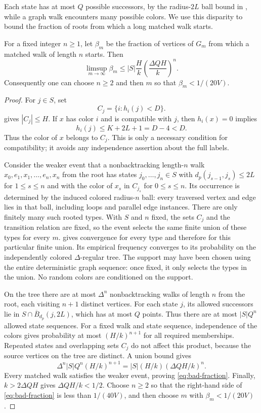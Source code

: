 Each state has at most $Q$ possible successors, by the radius-$2L$
ball bound in , while a graph walk encounters
many possible colors. We use this disparity to bound the
fraction of roots from which a long matched walk starts.

\begin{lemma}\label{lem:rare-walks}
For a fixed integer $n\ge1$, let $\beta_m$ be the fraction of vertices
of $G_m$ from which a matched walk of length $n$ starts. Then
\begin{equation}\label{eq:bad-fraction}
 \limsup_{m\to\infty}\beta_m
 \le |S|\frac Hk\left(\frac{\Delta QH}{k}\right)^n.
\end{equation}
Consequently one can choose $n\ge2$ and then $m$ so that
$\beta_m<1/(20V)$.
\end{lemma}

\begin{proof}
For $j\in S$, set
\[
 C_j=\{i:h_i(j)<D\}.
\]
 gives $|C_j|\le H$. If $x$ has color $i$
and is compatible with $j$, then $h_i(x)=0$ implies
\[
 h_i(j)\le K+2L+1=D-4<D.
\]
Thus the color of $x$ belongs to $C_j$. This is only a necessary
condition for compatibility; it avoids any independence assertion
about the full labels.

Consider the weaker event that a nonbacktracking length-$n$ walk
$x_0,e_1,x_1,\ldots,e_n,x_n$ from the root has states
$j_0,\ldots,j_n\in S$ with $d_p(j_{s-1},j_s)\le2L$ for $1\le s\le n$
and with the color of $x_s$ in $C_{j_s}$ for $0\le s\le n$.
Its occurrence is determined
by the induced colored radius-$n$ ball: every traversed vertex and
edge lies in that ball, including loops and parallel edge instances.
There are only finitely many such rooted types. With $S$ and $n$ fixed,
the sets $C_j$ and the transition relation are fixed, so the event selects
the same finite union of these types for every $m$.
 gives convergence for
every type and therefore for this particular finite union. Its empirical
frequency converges to its probability on the independently colored
$\Delta$-regular tree. The support may have been chosen using the entire
deterministic graph sequence: once fixed, it only selects the types in
the union. No random colors are conditioned on the support.

On the tree there are at most $\Delta^n$ nonbacktracking walks of
length $n$ from the root, each visiting $n+1$ distinct vertices.
For each state $j$, its allowed successors lie in
$S\cap\overline B_{d_p}(j,2L)$, which has at most $Q$ points.
Thus there are at most $|S|Q^n$ allowed state sequences. For a fixed
walk and state sequence, independence of the colors gives probability
at most $(H/k)^{n+1}$ for all required memberships. Repeated states
and overlapping sets $C_j$ do not affect this product, because the
source vertices on the tree are distinct. A union bound gives
\[
 \Delta^n|S|Q^n(H/k)^{n+1}
 =|S|(H/k)(\Delta QH/k)^n.
\]
Every matched walk satisfies the weaker event, proving
\eqref{eq:bad-fraction}. Finally, $k>2\Delta QH$ gives
$\Delta QH/k<1/2$. Choose $n\ge2$ so that the right-hand side of
\eqref{eq:bad-fraction} is less than $1/(40V)$, and then choose $m$
with $\beta_m<1/(20V)$.
\end{proof}


